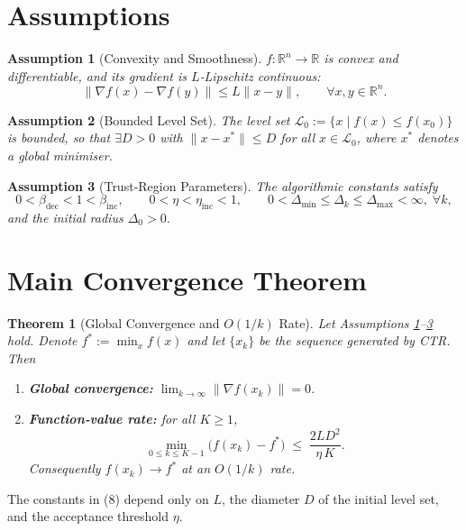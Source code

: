 \documentclass[11pt]{article}
\newtheorem{theorem}{Theorem}[section]
\newtheorem{assumption}{Assumption}[section]
\begin{document}
\section{Assumptions}
\label{sec:assumptions}
\begin{assumption}[Convexity and Smoothness]\label{as:convex}
$f:\mathbb{R}^{n}\to\mathbb{R}$ is convex and differentiable, and its gradient is
$L$‑Lipschitz continuous:
\[
\|\nabla f(x)-\nabla f(y)\|\le L\|x-y\|,\qquad\forall x,y\in\mathbb{R}^{n}.
\]
\end{assumption}
\begin{assumption}[Bounded Level Set]\label{as:bounded}
The level set $\mathcal{L}_{0}:=\{x\mid f(x)\le f(x_{0})\}$ is bounded, so that
$\exists D>0$ with $\|x-x^{*}\|\le D$ for all $x\in\mathcal{L}_{0}$, where $x^{*}$ denotes a
global minimiser.
\end{assumption}
\begin{assumption}[Trust‑Region Parameters]\label{as:params}
The algorithmic constants satisfy
\[
0<\beta_{\text{dec}}<1<\beta_{\text{inc}},\qquad
0<\eta<\eta_{\text{inc}}<1,\qquad
0<\Delta_{\min}\le\Delta_{k}\le\Delta_{\max}<\infty,\;\forall k,
\]
and the initial radius $\Delta_{0}>0$.
\end{assumption}

\section{Main Convergence Theorem}
\label{sec:theorem}
\begin{theorem}[Global Convergence and $O(1/k)$ Rate]\label{thm:global}
Let Assumptions \ref{as:convex}–\ref{as:params} hold.  
Denote $f^{*}:=\min_{x}f(x)$ and let $\{x_{k}\}$ be the sequence generated by
CTR. Then
\begin{enumerate}[label=(\alph*)]
\item \textbf{Global convergence:} $\displaystyle\lim_{k\to\infty}\| \nabla f(x_{k})\|=0$.
\item \textbf{Function‑value rate:} for all $K\ge1$,
\[
\min_{0\le k\le K-1}\bigl(f(x_{k})-f^{*}\bigr)
\;\le\;
\frac{2L D^{2}}{\eta\,K}.
\tag{8}
\]
Consequently $f(x_{k})\to f^{*}$ at an $O(1/k)$ rate.
\end{enumerate}
\end{theorem}
The constants in (8) depend only on $L$, the diameter $D$ of the initial level set,
and the acceptance threshold $\eta$.

\end{document}
